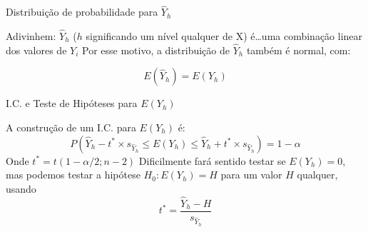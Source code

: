 \documentclass{beamer}\usepackage[]{graphicx}\usepackage[]{color}
\begin{document}
\begin{frame}{Distribuição de probabilidade para $\hat{Y}_h$}

Adivinhem: $\hat Y_h$ ($h$ significando um nível qualquer de X) é\ldots \pause uma combinação linear dos valores de $Y_i$
\vfill
Por esse motivo, a distribuição de $\hat Y_h$ também é normal, com:

\begin{equation*}
E(\hat Y_h) = E(Y_h) 
\end{equation*}



\end{frame}


\begin{frame}{I.C. e Teste de Hipóteses para $E(Y_h)$}

A construção de um I.C. para $E(Y_h)$ é:
\begin{equation*}
P(\hat Y_h - t^* \times s_{\hat Y_h} \leq E(Y_h) \leq \hat Y_h + t^* \times s_{\hat Y_h} ) =  1 - \alpha
\end{equation*}
Onde $t^* = t(1-\alpha/2;n-2)$ \pause
\vfill
Dificilmente fará sentido testar se $E(Y_h) = 0$, mas podemos testar a hipótese $H_0: E(Y_h) = H$  para um valor $H$ qualquer, usando
\begin{equation*}
t^* = \frac{\hat Y_h - H}{s_{\hat Y_h}} 
\end{equation*}

\end{frame}
\end{document}
